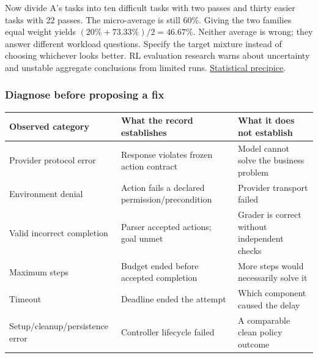 \documentclass[
  11pt,
  letterpaper,
]{article}
\newcounter{none} %
\begin{document}
Now divide A's tasks into ten difficult tasks with two passes and thirty
easier tasks with 22 passes. The micro-average is still 60\%. Giving the
two families equal weight yields \((20\%+73.33\%)/2=46.67\%\). Neither
average is wrong; they answer different workload questions. Specify the
target mixture instead of choosing whichever looks better. RL evaluation
research warns about uncertainty and unstable aggregate conclusions from
limited runs. \href{https://arxiv.org/abs/2108.13264}{Statistical
precipice}.

\subsubsection{Diagnose before proposing a
fix}\label{diagnose-before-proposing-a-fix}

{\def\LTcaptype{none} %
\begin{longtable}[]{@{}
  >{\raggedright\arraybackslash}p{}
  >{\raggedright\arraybackslash}p{}
  >{\raggedright\arraybackslash}p{}@{}}
\toprule\noalign{}
\begin{minipage}[b]{\linewidth}\raggedright
Observed category
\end{minipage} & \begin{minipage}[b]{\linewidth}\raggedright
What the record establishes
\end{minipage} & \begin{minipage}[b]{\linewidth}\raggedright
What it does not establish
\end{minipage} \\
\midrule\noalign{}
\endhead
\bottomrule\noalign{}
\endlastfoot
Provider protocol error & Response violates frozen action contract &
Model cannot solve the business problem \\
Environment denial & Action fails a declared permission/precondition &
Provider transport failed \\
Valid incorrect completion & Parser accepted actions; goal unmet &
Grader is correct without independent checks \\
Maximum steps & Budget ended before accepted completion & More steps
would necessarily solve it \\
Timeout & Deadline ended the attempt & Which component caused the
delay \\
Setup/cleanup/persistence error & Controller lifecycle failed & A
comparable clean policy outcome \\
\end{longtable}
}
\end{document}
